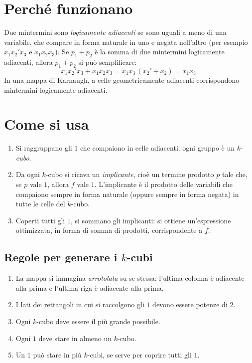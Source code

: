 \documentclass[11pt,a4paper]{article}
\begin{document}
\section{Perché funzionano}

Due mintermini sono \emph{logicamente adiacenti} se sono uguali a meno di una variabile, che compare in forma naturale in uno e negata nell'altro (per esempio $x_1x_2'x_3$ e $x_1x_2x_3$). Se $p_1 + p_2$ è la somma di due mintermini logicamente adiacenti, allora $p_1 + p_2$ si può semplificare:
\[
x_1x_2'x_3 + x_1x_2x_3 = x_1x_3\,(x_2' + x_2) = x_1x_3.
\]
In una mappa di Karnaugh, a celle geometricamente adiacenti corrispondono mintermini logicamente adiacenti.

\section{Come si usa}

\begin{enumerate}
    \item Si raggruppano gli $1$ che compaiono in celle adiacenti: ogni gruppo è un \emph{$k$-cubo}.
    \item Da ogni $k$-cubo si ricava un \emph{implicante}, cioè un termine prodotto $p$ tale che, se $p$ vale $1$, allora $f$ vale $1$. L'implicante è il prodotto delle variabili che compaiono sempre in forma naturale (oppure sempre in forma negata) in tutte le celle del $k$-cubo.
    \item Coperti tutti gli $1$, si sommano gli implicanti: si ottiene un'espressione ottimizzata, in forma di somma di prodotti, corrispondente a $f$.
\end{enumerate}

\subsection*{Regole per generare i $k$-cubi}

\begin{enumerate}
    \item La mappa si immagina \emph{arrotolata} su se stessa: l'ultima colonna è adiacente alla prima e l'ultima riga è adiacente alla prima.
    \item I lati dei rettangoli in cui si raccolgono gli $1$ devono essere potenze di $2$.
    \item Ogni $k$-cubo deve essere il più grande possibile.
    \item Ogni $1$ deve stare in almeno un $k$-cubo.
    \item Un $1$ può stare in più $k$-cubi, se serve per coprire tutti gli $1$.
\end{enumerate}
\end{document}
